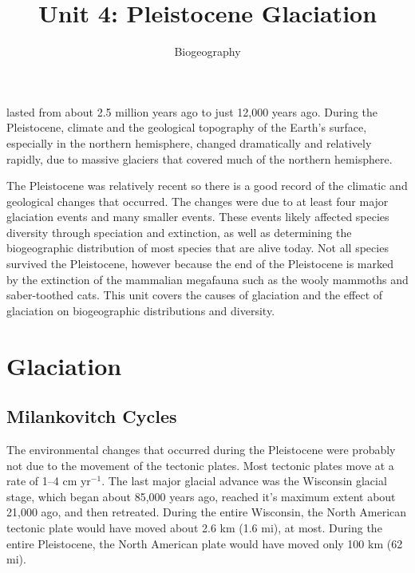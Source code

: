 \documentclass{tufte-handout}
\title{Unit 4: Pleistocene Glaciation}
\author{Biogeography}
\date{}
\begin{document}
\maketitle%



 lasted from about 2.5 million years ago to just 12,000 years ago.  During the Pleistocene, climate and the geological topography of the Earth's surface, especially in the northern hemisphere, changed dramatically and relatively rapidly, due to massive glaciers  that covered much of the northern hemisphere.  

The Pleistocene was relatively recent so there is a good record of the climatic and geological changes that occurred. The changes were due to at least four major glaciation events and many smaller events.  These events likely affected species diversity through speciation and extinction, as well as determining the biogeographic distribution of most species that are alive today.  Not all species survived the Pleistocene, however because the end of the Pleistocene is marked by the extinction of the mammalian megafauna such as the wooly mammoths and saber-toothed cats.  This unit covers the causes of glaciation and the effect of glaciation on biogeographic distributions and diversity.

\section{Glaciation}\label{sec:glaciation}
\subsection{Milankovitch Cycles}\label{sec:milankovitch}

The environmental changes that occurred during the Pleistocene were probably not due to the movement of the tectonic plates. Most tectonic plates move at a rate of  1–4 cm yr$^{-1}$.  The last major glacial advance was the Wisconsin glacial stage, which began about 85,000 years ago, reached it's maximum extent about 21,000 ago, and then retreated. During the entire Wisconsin, the North American tectonic plate would have moved about 2.6 km (1.6 mi), at most.  During the entire Pleistocene, the North American plate would have moved only 100 km (62 mi). 
\end{document}
